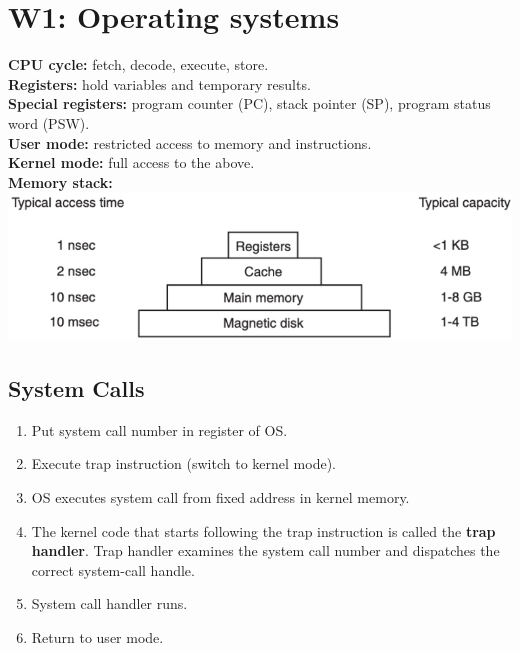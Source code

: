 \section{W1: Operating systems}
\textbf{CPU cycle:} fetch, decode, execute, store.\\
\textbf{Registers:} hold variables and temporary results.\\
\textbf{Special registers:} program counter (PC), stack pointer (SP), program status word (PSW).\\
\textbf{User mode:} restricted access to memory and instructions.\\
\textbf{Kernel mode:} full access to the above.\\
\textbf{Memory stack:}\\
\includegraphics[width=\linewidth]{figs/memory-stack.png}

\subsection{System Calls}
\begin{enumerate}
    \item Put system call number in register of OS.
    \item Execute trap instruction (switch to kernel mode).
    \item OS executes system call from fixed address in kernel memory.
    \item The kernel code that starts following the trap instruction is called the \textbf{trap handler}. Trap handler examines the system call number and dispatches the correct system-call handle.
    \item System call handler runs.
    \item Return to user mode.
\end{enumerate}
